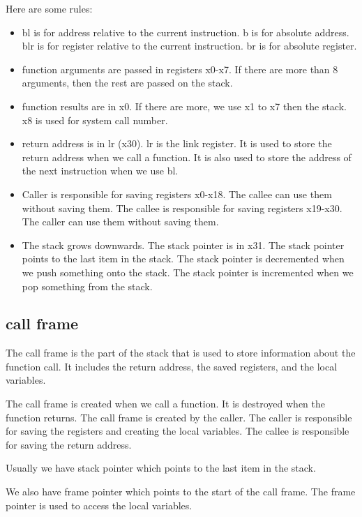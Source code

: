 \documentclass[letterpaper,12pt]{article}
\begin{document}
Here are some rules:
\begin{itemize}
    \item bl is for address relative to the current instruction. b is for absolute
          address. blr is for register relative to the current instruction. br is for
          absolute register.
    \item function arguments are passed in registers x0-x7. If there are more than 8
          arguments, then the rest are passed on the stack.
    \item function results are in x0. If there are more, we use x1 to x7 then the stack.
          x8 is used for system call number.
    \item return address is in lr (x30). lr is the link register. It is used to store the
          return address when we call a function. It is also used to store the address of
          the next instruction when we use bl.
    \item Caller is responsible for saving registers x0-x18. The callee can use them
          without saving them. The callee is responsible for saving registers x19-x30.
          The caller can use them without saving them.
    \item The stack grows downwards. The stack pointer is in x31. The stack pointer
          points to the last item in the stack. The stack pointer is decremented when we
          push something onto the stack. The stack pointer is incremented when we pop
          something from the stack.
\end{itemize}
\subsection{call frame}
The call frame is the part of the stack that is used to store information about
the function call. It includes the return address, the saved registers, and the
local variables.

The call frame is created when we call a function. It is destroyed when the
function returns. The call frame is created by the caller. The caller is
responsible for saving the registers and creating the local variables. The
callee is responsible for saving the return address.

Usually we have stack pointer which points to the last item in the stack.

We also have frame pointer which points to the start of the call frame. The
frame pointer is used to access the local variables.
\end{document}
